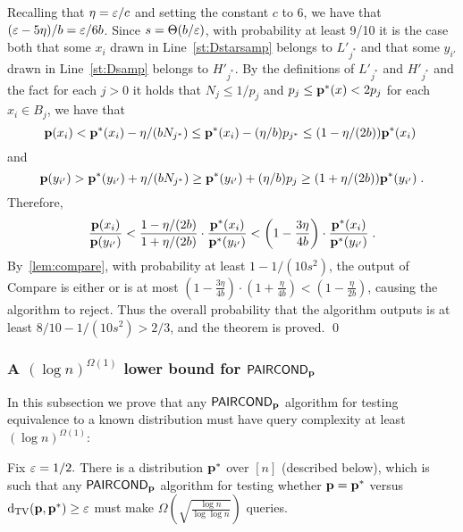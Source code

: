 Recalling that $\eta = \varepsilon/c$ and setting the
constant $c$ to $6$, we have that
$(\varepsilon - 5\eta)/b = \varepsilon/6b$.  Since $s=\Theta(b/\varepsilon)$,
with probability at least 9/10 it is the case both that some $x_i$
drawn in Line~\ref{st:Dstarsamp} belongs to
$L'_{j^\ast}$ and that some $y_{i'}$ drawn in Line~\ref{st:Dsamp}
belongs to $H'_{j^\ast}$.
By the definitions of $L'_{j^\ast}$ and $H'_{j^\ast}$
and the fact for each $j >0$ it holds that
$N_j \leq 1/p_j$
and $p_j \leq \mathbf{p}^\ast(x) < 2 p_j$ for each $x_{i} \in B_j$, we
have that
\begin{equation}
\mathbf{p}(x_i) < \mathbf{p}^\ast(x_i) - \eta/(b N_{j^\ast})
       \leq \mathbf{p}^\ast(x_i) - (\eta/b)p_{j^\ast}
       \leq (1-\eta/(2b))\mathbf{p}^{\ast}(x_i)\;
\end{equation}
and
\begin{equation}
\mathbf{p}(y_{i'}) > \mathbf{p}^\ast(y_{i'}) + \eta/(b N_{j^\ast})
     \geq \mathbf{p}^\ast(y_{i'})  + (\eta/b)p_j
     \geq (1+\eta/(2b)) \mathbf{p}^\ast(y_{i'})\;.
\end{equation}
Therefore,
{
\begin{equation}
\frac{\mathbf{p}(x_i)}{\mathbf{p}(y_{i'})}
   < \frac{1-\eta/(2b)}{1+\eta/(2b)}
   \cdot \frac{\mathbf{p}^\ast(x_i)}{\mathbf{p}^\ast(y_{i'})}
    < \left(1-\frac{3\eta}{4b}\right) \cdot
       \frac{\mathbf{p}^\ast(x_i)}{\mathbf{p}^\ast(y_{i'})}\;.
\end{equation}
By~\cref{lem:compare}, with probability at least $1-1/(10s^2)$,
the output of {\sc Compare} is either \low or is at most
$\left(1-\frac{3\eta}{4b}\right)\cdot\left(1+\frac{\eta}{4b}\right)
 < \left(1-\frac{\eta}{2b}\right)$, causing the algorithm to reject.
}
                                              Thus the overall probability
that the algorithm outputs \reject is at least $8/10 - 1/(10s^2) > 2/3$,
and the theorem is proved.
\qed

\subsubsection{A \texorpdfstring{$(\log n)^{\Omega(1)}$}{(log n)\^{}Omega(1)} lower bound for \texorpdfstring{${\sf PAIRCOND}_{\mathbf{p}}$}{\PCOND}}\label{ssec:lb-Pcond-Dstar}

In this subsection we prove that any ${\sf PAIRCOND}_{\mathbf{p}}$ algorithm
for testing equivalence to a known distribution must have
query complexity at least $(\log n)^{\Omega(1)}$:

\begin{theorem} \label{thm:pcond-ddstar-lb}
Fix $\varepsilon = 1/2.$ There is a distribution $\mathbf{p}^\ast$ over $[n]$
(described below), which is such that
any ${\sf PAIRCOND}_{\mathbf{p}}$ algorithm for testing whether $\mathbf{p} = \mathbf{p}^\ast$
versus $\operatorname{d}_{\rm{TV}}(\mathbf{p},\mathbf{p}^\ast) \geq \varepsilon$ must make $\Omega\left(
\sqrt{{\frac {\log n}{\log \log n}}}
\right)$ queries.
\end{theorem}

